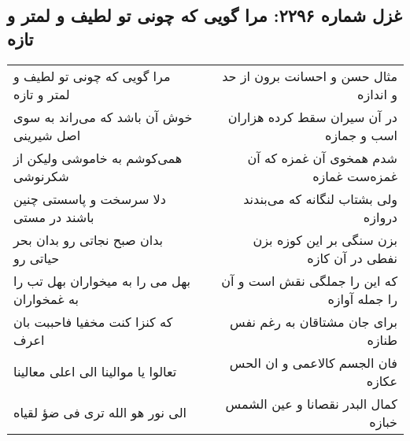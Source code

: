 \begin{center}
\section*{غزل شماره ۲۲۹۶: مرا گویی که چونی تو لطیف و لمتر و تازه}
\label{sec:2296}
\begin{longtable}{l p{0.5cm} r}
مرا گویی که چونی تو لطیف و لمتر و تازه
&&
مثال حسن و احسانت برون از حد و اندازه
\\
خوش آن باشد که می‌راند به سوی اصل شیرینی
&&
در آن سیران سقط کرده هزاران اسب و جمازه
\\
همی‌کوشم به خاموشی ولیکن از شکرنوشی
&&
شدم همخوی آن غمزه که آن غمزه‌ست غمازه
\\
دلا سرسخت و پاسستی چنین باشند در مستی
&&
ولی بشتاب لنگانه که می‌بندند دروازه
\\
بدان صبح نجاتی رو بدان بحر حیاتی رو
&&
بزن سنگی بر این کوزه بزن نفطی در آن کازه
\\
بهل می را به میخواران بهل تب را به غمخواران
&&
که این را جملگی نقش است و آن را جمله آوازه
\\
که کنزا کنت مخفیا فاحببت بان اعرف
&&
برای جان مشتاقان به رغم نفس طنازه
\\
تعالوا یا موالینا الی اعلی معالینا
&&
فان الجسم کالاعمی و ان الحس عکازه
\\
الی نور هو الله تری فی ضؤ لقیاه
&&
کمال البدر نقصانا و عین الشمس خبازه
\\
\end{longtable}
\end{center}
